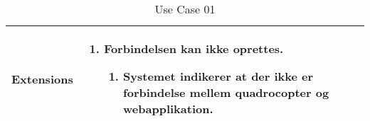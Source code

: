 \begin{table}[H]
\begin{tabular}{|l|p{10cm}|}
Extensions							& 

									\renewcommand{\labelenumi}{\Roman{enumi}:}
									\renewcommand{\labelenumii}{\alph{enumii})}
									\begin{enumerate}[topsep=0.0cm,leftmargin=0.5cm]
										\item Forbindelsen kan ikke oprettes.
											\begin{enumerate}[topsep=0cm, leftmargin=1cm]
												\item Systemet indikerer at der ikke er forbindelse mellem quadrocopter og
webapplikation.
											\end{enumerate}
									\end{enumerate} \\\hline	

\end{tabular}
\caption{Use Case 01}
\label{tab:UC01}
\end{table}